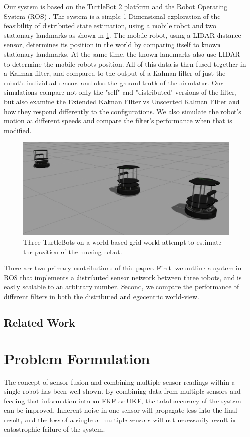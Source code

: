 \documentclass[conference]{IEEEtran} \usepackage[T1]{fontenc} \usepackage[backend=biber, style=ieee]{biblatex}
\begin{document}
Our system is based on the TurtleBot 2 platform and the Robot Operating System (ROS) \cite{ros_original}. The system is a simple 1-Dimensional exploration of the feasibility of distributed state estimation, using a mobile robot and two stationary landmarks as shown in \ref{pic1}. The mobile robot, using a LIDAR distance sensor, determines its position in the world by comparing itself to known stationary landmarks. At the same time, the known landmarks also use LIDAR to determine the mobile robots position. All of this data is then fused together in a Kalman filter, and compared to the output of a Kalman filter of just the robot's individual sensor, and also the ground truth of the simulator. Our simulations compare not only the "self" and "distributed" versions of the filter, but also examine the Extended Kalman Filter vs Unscented Kalman Filter and how they respond differently to the configurations. We also simulate the robot's motion at different speeds and compare the filter's performance when that is modified.

\begin{figure}[!ht]
\label{pic1} 
\centering 
\includegraphics[scale=.2]{sim1}
\caption{Three TurtleBots on a world-based grid world attempt to estimate the position of the moving robot.}
\end{figure}

There are two primary contributions of this paper. First, we outline a system in ROS that implements a distributed sensor network between three robots, and is easily scalable to an arbitrary number. Second, we compare the performance of different filters in both the distributed and egocentric world-view.

\subsection{Related Work}

\section{Problem Formulation} \label{Problem Formulation} %
The concept of sensor fusion and combining multiple sensor readings within a single robot has been well shown. By
combining data from multiple sensors and feeding that information into an EKF or UKF, the total accuracy of the system
can be improved. Inherent noise in one sensor will propagate less into the final result, and the loss of a single or
multiple sensors will not necessarily result in catastrophic failure of the system.
\end{document}
